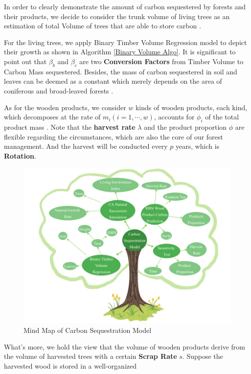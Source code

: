 \documentclass{mcmthesis}
\numberwithin{figure}{section}
\numberwithin{table}{section}
\numberwithin{equation}{section}
\begin{document}
In order to clearly demonstrate the amount of carbon sequestered by forests and their
products, we decide to consider the trunk volume of living trees as an estimation of 
total Volume of trees that are able to store carbon \citep{WangYan}. 
\par
For the living trees, we apply Binary Timber Volume Regression model \citep{LuoQingbang} 
to depict their growth as shown in Algorithm \ref{Binary Volume Algo}. 
It is significant
to point out that $ \beta_b $ and $ \beta_c $ are two \textbf{Conversion Factors} from
Timber Volume to Carbon Mass sequestered. Besides, the mass of carbon sequestered in
soil and leaves can be deemed as a constant which merely depends on the area
of coniferous and broad-leaved forests \citep{YanDeren2011}. 
\par
As for the wooden products, we consider $ w $ kinds of wooden products, each kind,
which decomposes at the rate of $ m_i (i = 1,\cdots, w) $, accounts for $ \phi_i$ 
of the total product mass \citep{2006Forest}. Note that the \textbf{harvest rate} $ \lambda $ and the product
proportion $ \phi $ are flexible regarding the circumstances, which are also 
the core of our forest management. And the harvest will be conducted every 
$ p $ years, which is \textbf{Rotation}. 
\begin{figure}[htbp]
  \centering
  \includegraphics[width = 12cm]{code&pic/采伐率mindmap.pdf}
  \caption{Mind Map of Carbon Sequestration Model}
\end{figure}
\par
What's more, we hold the view that 
the volume of wooden products derive from the volume of harvested trees with a certain
\textbf{Scrap Rate} $ s $. Suppose the harvested wood is stored in a well-organized
\end{document}
